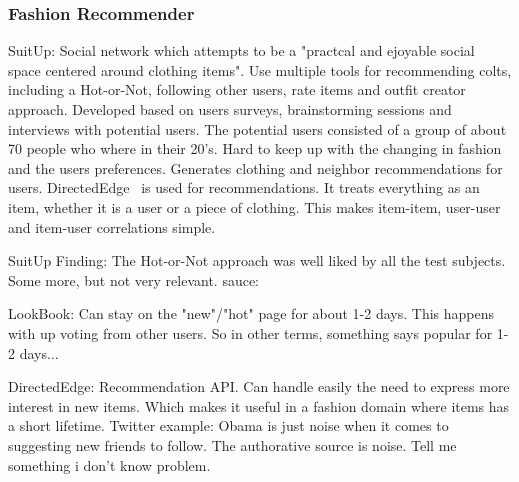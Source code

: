 


\subsubsection{Fashion Recommender}

SuitUp:
Social network which attempts to be a "practcal and ejoyable social space centered around clothing items".
Use multiple tools for recommending colts, including a Hot-or-Not, following other users, rate items and outfit creator approach.
Developed based on users surveys, brainstorming sessions and interviews with potential users.
The potential users consisted of a group of about 70 people who where in their 20's.
Hard to keep up with the changing in fashion and the users preferences.
Generates clothing and neighbor recommendations for users.
DirectedEdge~\cite{direcetedEdge} is used for recommendations.
It treats everything as an item, whether it is a user or a piece of clothing.
This makes item-item, user-user and item-user correlations simple.

SuitUp Finding:
The Hot-or-Not approach was well liked by all the test subjects.
Some more, but not very relevant.
sauce:\cite{SuitUp}

LookBook:
Can stay on the "new"/"hot" page for about 1-2 days.
This happens with up voting from other users.
So in other terms, something says popular for 1-2 days...

DirectedEdge:
Recommendation API.
Can handle easily the need to express more interest in new items.
Which makes it useful in a fashion domain where items has a short lifetime.
Twitter example:
Obama is just noise when it comes to suggesting new friends to follow.
The authorative source is noise.
Tell me something i don't know problem.


